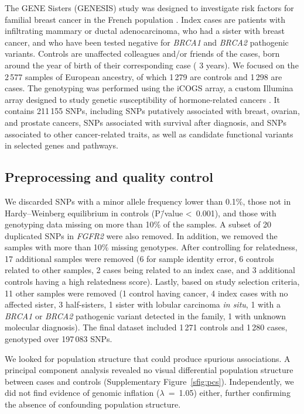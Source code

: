 \documentclass[10pt,letterpaper]{article}
\begin{document}
The GENE Sisters (GENESIS) study was designed to investigate risk factors for familial breast cancer in the French population \cite{sinilnikova_genesis:_2016}. Index cases are patients with infiltrating mammary or ductal adenocarcinoma, who had a sister with breast cancer, and who have been tested negative for \emph{BRCA1} and \emph{BRCA2} pathogenic variants. Controls are unaffected colleagues and/or friends of the cases, born around the year of birth of their corresponding case (\textpm{} 3 years). We focused on the 2\,577 samples of European ancestry, of which 1\,279 are controls and 1\,298 are cases. The genotyping was performed using the iCOGS array, a custom Illumina array designed to study genetic susceptibility of hormone-related cancers \cite{sakoda_turning_2013}. It contains 211\,155 SNPs, including SNPs putatively associated with breast, ovarian, and prostate cancers, SNPs associated with survival after diagnosis, and SNPs associated to other cancer-related traits, as well as candidate functional variants in selected genes and pathways.

\subsection{Preprocessing and quality control}

We discarded SNPs with a minor allele frequency lower than 0.1\%, those not in Hardy--Weinberg equilibrium in controls (P\=/value \textless~0.001), and those with genotyping data missing on more than 10\% of the samples. A subset of 20 duplicated SNPs in \emph{FGFR2} were also removed. In addition, we removed the samples with more than 10\% missing genotypes. After controlling for relatedness, 17 additional samples were removed (6 for sample identity error, 6 controls related to other samples, 2 cases being related to an index case, and 3 additional controls having a high relatedness score). Lastly, based on study selection criteria, 11 other samples were removed (1 control having cancer, 4 index cases with no affected sister, 3 half-sisters, 1 sister with lobular carcinoma \emph{in situ}, 1 with a \emph{BRCA1} or \emph{BRCA2} pathogenic variant detected in the family, 1 with unknown molecular diagnosis). The final dataset included 1\,271 controls and 1\,280 cases, genotyped over 197\,083 SNPs. 

We looked for population structure that could produce spurious associations. A principal component analysis revealed no visual differential population structure between cases and controls (Supplementary Figure~\ref{sfig:pcs}). Independently, we did not find evidence of genomic inflation (\(\lambda\)~=~1.05) either, further confirming the absence of confounding population structure.
\end{document}

